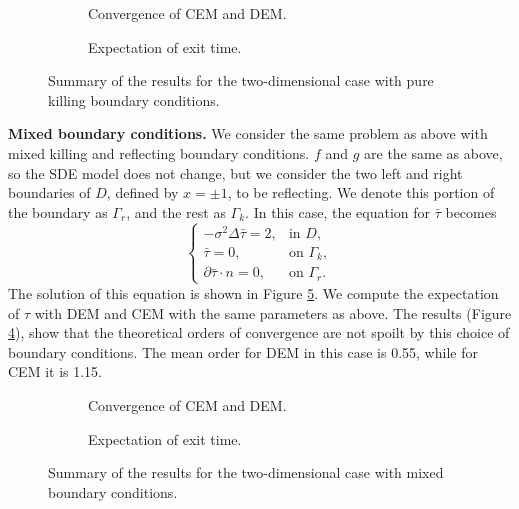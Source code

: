 \begin{figure}[t]
    \centering
    \begin{subfigure}{0.49\linewidth}
        \centering
        \resizebox{1\linewidth}{!}{ }  
        \caption{Convergence of CEM and DEM.}
        \label{fig:KillTwoD}
    \end{subfigure}
    \begin{subfigure}{0.49\linewidth}
        \centering
        \resizebox{1\linewidth}{!}{ }  
        \caption{Expectation of exit time.}
        \label{fig:TauExact2DKill}
    \end{subfigure}    
    \caption{Summary of the results for the two-dimensional case with pure killing boundary conditions.}
    \label{fig:OrdersTwoDKill}
\end{figure}
\vspace{2mm}
\noindent\textbf{Mixed boundary conditions.} We consider the same problem as above with mixed killing and reflecting boundary conditions. $f$ and $g$ are the same as above, so the SDE model does not change, but we consider the two left and right boundaries of $D$, defined by $x = \pm 1$, to be reflecting. We denote this portion of the boundary as $\Gamma_r$, and the rest as $\Gamma_k$. In this case, the equation for $\bar\tau$ becomes
\begin{equation}\label{eq:PDETau2DKilling}
\begin{cases}
	- \sigma^2 \Delta \bar \tau = 2, & \text{in } D, \\
	\bar \tau = 0, & \text{on } \Gamma_k, \\
	\partial \bar \tau \cdot n = 0, & \text{on } \Gamma_r.
\end{cases}
\end{equation}
The solution of this equation is shown in Figure \ref{fig:TauExact2DRefl}. We compute the expectation of $\tau$ with DEM and CEM with the same parameters as above. The results (Figure \ref{fig:ReflTwoD}), show that the theoretical orders of convergence are not spoilt by this choice of boundary conditions. The mean order for DEM in this case is 0.55, while for CEM it is 1.15.


\begin{figure}[t]
    \centering
    \begin{subfigure}{0.49\linewidth}
        \centering
        \resizebox{1\linewidth}{!}{ }  
        \caption{Convergence of CEM and DEM.}
        \label{fig:ReflTwoD}
    \end{subfigure}
    \begin{subfigure}{0.49\linewidth}
        \centering
        \resizebox{1\linewidth}{!}{ }  
        \caption{Expectation of exit time.}
        \label{fig:TauExact2DRefl}
    \end{subfigure}    
    \caption{Summary of the results for the two-dimensional case with mixed boundary conditions.}
    \label{fig:OrdersTwoDRefl}
\end{figure}
